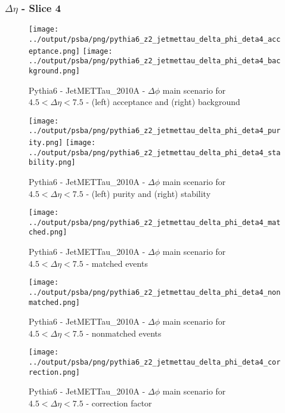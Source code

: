 \documentclass[11pt]{book}
\begin{document}
\clearpage
\subsubsection{$\Delta\eta$ - Slice 4}

\begin{figure}[ht]
\centering
\texttt{[image: ../output/psba/png/pythia6\_z2\_jetmettau\_delta\_phi\_deta4\_acceptance.png]}
\texttt{[image: ../output/psba/png/pythia6\_z2\_jetmettau\_delta\_phi\_deta4\_background.png]}
\caption{Pythia6 - JetMETTau\_2010A - $\Delta\phi$ main scenario for $4.5 < \Delta\eta < 7.5$ - (left) acceptance and (right) background}
\label{fig:p6_jetmettau_delta_phi_deta4_ab}
\end{figure}

\begin{figure}[ht]
\centering
\texttt{[image: ../output/psba/png/pythia6\_z2\_jetmettau\_delta\_phi\_deta4\_purity.png]}
\texttt{[image: ../output/psba/png/pythia6\_z2\_jetmettau\_delta\_phi\_deta4\_stability.png]}
\caption{Pythia6 - JetMETTau\_2010A - $\Delta\phi$ main scenario for $4.5 < \Delta\eta < 7.5$ - (left) purity and (right) stability}
\label{fig:p6_jetmettau_delta_phi_deta4_ps}
\end{figure}

\begin{figure}[ht]
\centering
\texttt{[image: ../output/psba/png/pythia6\_z2\_jetmettau\_delta\_phi\_deta4\_matched.png]}
\caption{Pythia6 - JetMETTau\_2010A - $\Delta\phi$ main scenario for $4.5 < \Delta\eta < 7.5$ - matched events}
\label{fig:p6_jetmettau_delta_phi_deta4_matched}
\end{figure}

\begin{figure}[ht]
\centering
\texttt{[image: ../output/psba/png/pythia6\_z2\_jetmettau\_delta\_phi\_deta4\_nonmatched.png]}
\caption{Pythia6 - JetMETTau\_2010A - $\Delta\phi$ main scenario for $4.5 < \Delta\eta < 7.5$ - nonmatched events}
\label{fig:p6_jetmettau_delta_phi_deta4_nonmatched}
\end{figure}

\begin{figure}[ht]
\centering
\texttt{[image: ../output/psba/png/pythia6\_z2\_jetmettau\_delta\_phi\_deta4\_correction.png]}
\caption{Pythia6 - JetMETTau\_2010A - $\Delta\phi$ main scenario for $4.5 < \Delta\eta < 7.5$ - correction factor}
\label{fig:p6_jetmettau_delta_phi_deta4_correction}
\end{figure}
\end{document}
